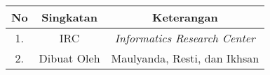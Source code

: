 \begin{singkatan}
\thispagestyle{plain}
\begin{table}[ht]
	\centering
	\begin{tabular}{|c|c|c|}
	\hline
		\textbf{No} & \textbf{Singkatan} & \textbf{Keterangan}   \\
	\hline
		1. & IRC       & \textit{Informatics Research Center}  \\
		2. & Dibuat Oleh & Maulyanda, Resti, dan Ikhsan \\
	\hline    
	\end{tabular}
\end{table}

\end{singkatan}